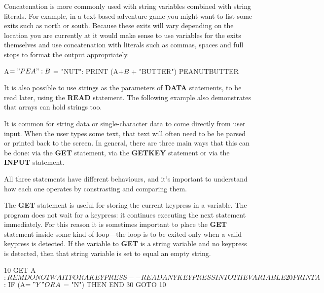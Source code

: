 Concatenation is more commonly used with string variables combined with string literals. For example, in a text-based adventure game you might want to list some exits such as north or south. Because these exits will vary depending on the location you are currently at it would make sense to use variables for the exits themselves and use concatenation with literals such as commas, spaces and full stops to format the output appropriately.

\begin{screencode}
A$ = "PEA": B$ = "NUT": PRINT (A$ + B$ + "BUTTER")
PEANUTBUTTER
\end{screencode}

It is also possible to use strings as the parameters of {\bf DATA} statements, to be read later, using the {\bf READ} statement. The following example also demonstrates that arrays can hold strings too.


It is common for string data or single-character data to come directly from user input. When the user types some text, that text will often need to be be parsed or printed back to the screen. In general, there are three main ways that this can be done: via the {\bf GET} statement, via the {\bf GETKEY} statement or via the {\bf INPUT} statement.

All three statements have different behaviours, and it's important to understand how each one operates by constrasting and comparing them.

The {\bf GET} statement is useful for storing the current keypress in a variable. The program does not wait for a keypress: it continues executing the next statement immediately. For this reason it is sometimes important to place the {\bf GET} statement inside some kind of loop---the loop is to be exited only when a valid keypress is detected. If the variable to {\bf GET} is a string variable and no keypress is detected, then that string variable is set to equal an empty string.

\begin{screencode}
10 GET A$: REM DO NOT WAIT FOR A KEYPRESS--READ ANY KEYPRESS INTO THE VARIABLE
20 PRINT A$: IF (A$ = "Y" OR A$ = "N") THEN END
30 GOTO 10
\end{screencode}

